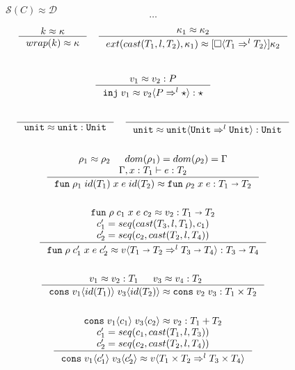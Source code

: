 \documentclass[acmsmall,review,anonymous]{acmart}\settopmatter{printfolios=true,printccs=false,printacmref=false}
\newcommand{\plus}[0]{+}
\newcommand{\judgeType}[2]{#1 : #2}
\newcommand{\TOOdyn}[0]{\star}
\newcommand{\POOunit}[0]{\mathtt{Unit}}
\newcommand{\POOfun}[2]{#1 \shortrightarrow #2}
\newcommand{\POOprod}[2]{#1 \times #2}
\newcommand{\POOsum}[2]{#1 \plus #2}
\newcommand{\cOOcast}[3]{#1 \Rightarrow^{#2} #3}
\newcommand{\vOOcast}[2]{#1\langle#2\rangle}
\newcommand{\vOOfun}[3]{\mathtt{fun} \; #1 \; #2 \; #3}
\newcommand{\vOOtt}[0]{\mathtt{unit}}
\newcommand{\vOOcons}[2]{\mathtt{cons}\;#1\;#2}
\newcommand{\kOOcast}[2]{
	[\square \langle #1 \rangle]#2}
\newcommand{\hcvOOinj}[2]{\mathtt{inj} \; #2}
\newcommand{\hcvOOfun}[5]{\mathtt{fun} \; #2 \; #1 \; #3 \; #4 \; #5}
\newcommand{\hcvOOtt}[0]{\mathtt{unit}}
\newcommand{\hcvOOcons}[4]{\mathtt{cons}\;#1\langle#2\rangle\;#3\langle#4\rangle}
\newcommand{\ineffCEKD}{$\mathcal{D}$}
\newcommand{\effCEK}[1]{$\mathcal{S}(#1)$}
\begin{document}
\begin{figure}
	$\text{\effCEK{C}} \approx \text{\ineffCEKD}$
	\[\dots\]
	
	\fbox{$\kappa \approx \kappa$}
	\begin{gather*}
	\inference{
		k \approx \kappa
	}{
		wrap(k) \approx \kappa
	}
	\quad
	\inference{
		\kappa_1 \approx \kappa_2
	}{
		ext(cast(T_1,l,T_2),\kappa_1) \approx 
		\kOOcast{\cOOcast{T_1}{l}{T_2}}{\kappa_2}
	}
\\
	\end{gather*}
\\	
	\begin{gather}
	\inference{
		v_1 \approx v_2 : P
	}{
		\hcvOOinj{P}{v_1} \approx \vOOcast{v_2}{\cOOcast{P}{l}{\TOOdyn}}
		: \TOOdyn
	}
\\ \\
	\inference{}{
		\hcvOOtt \approx \vOOtt : \POOunit
	}
	\quad
	\inference{}{
		\hcvOOtt \approx \vOOcast{\vOOtt}{\cOOcast{\POOunit}{l}{\POOunit}}
		: \POOunit
	}
	\\ \\
	\inference{
		\rho_1 \approx \rho_2 &
		dom(\rho_1) = dom(\rho_2) = \Gamma \\
		\Gamma , x : T_1 \vdash e : T_2
	}{
		\hcvOOfun{id(T_1)}{\rho_1}{x}{e}{id(T_2)}
		\approx
		\vOOfun{\rho_2}{x}{e}
		: \POOfun{T_1}{T_2}
	}
\\ \\
\inference{
\hcvOOfun{c_1}{\rho}{x}{e}{c_2} \approx v_2 : \POOfun{T_1}{T_2} \\
c_1' = seq(cast(T_3,l,T_1),c_1) \\
c_2' = seq(c_2,cast(T_2,l,T_4))
}{
\hcvOOfun{c_1'}{\rho}{x}{e}{c_2'}
\approx
\vOOcast{v}{\cOOcast{\POOfun{T_1}{T_2}}{l}{\POOfun{T_3}{T_4}}}
: \POOfun{T_3}{T_4}
}
\\ \\
	\inference{
		v_1 \approx v_2 : T_1 &
		v_3 \approx v_4 : T_2 &
	}{
		\hcvOOcons{v_1}{id(T_1)}{v_3}{id(T_2)}
		\approx
		\vOOcons{v_2}{v_3}
		: \POOprod{T_1}{T_2}
	}
\\ \\
	\inference{
		\hcvOOcons{v_1}{c_1}{v_3}{c_2} \approx v_2 : \POOsum{T_1}{T_2} \\
		c_1' = seq(c_1,cast(T_1,l,T_3)) \\
		c_2' = seq(c_2,cast(T_2,l,T_4))
	}{
		\hcvOOcons{v_1}{c_1'}{v_3}{c_2'} \approx
		\vOOcast{v}{\cOOcast{\POOprod{T_1}{T_2}}{l}{\POOprod{T_3}{T_4}}}
}
\end{gather}
\end{figure}
\end{document}
